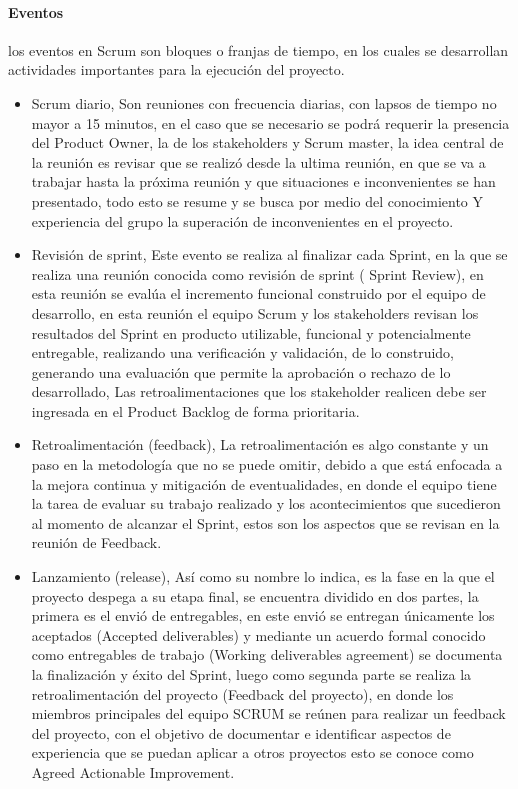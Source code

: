 \paragraph{Eventos}
los eventos en Scrum son bloques o franjas de tiempo, en los cuales se desarrollan actividades importantes para la ejecución del proyecto.
\begin{itemize}
    
    \item Scrum diario, Son reuniones con frecuencia diarias, con lapsos de tiempo no mayor a 15 minutos, en el caso que se necesario se podrá requerir la presencia del Product Owner, la de los stakeholders y Scrum master, la idea central de la reunión es revisar que se realizó desde la ultima reunión, en que se va a trabajar hasta la próxima reunión y que situaciones e inconvenientes se han presentado, todo esto se resume y se busca por medio del conocimiento Y experiencia del grupo la superación de inconvenientes en el proyecto. 
    \item Revisión de sprint, Este evento se realiza al finalizar cada Sprint, en la que se realiza una reunión conocida como revisión de sprint ( Sprint Review), en esta reunión se evalúa el incremento funcional construido por el equipo de desarrollo, en esta reunión el equipo Scrum y los stakeholders revisan los resultados del Sprint en producto utilizable, funcional y potencialmente entregable, realizando una verificación y validación, de lo construido, generando una evaluación que permite la aprobación o rechazo de lo desarrollado, Las retroalimentaciones que los stakeholder realicen debe ser ingresada  en el Product Backlog de forma prioritaria.  
    
     \item Retroalimentación (feedback), La retroalimentación es algo constante y un paso en la metodología que no se puede omitir, debido a que está enfocada a la mejora continua y mitigación de eventualidades, en donde el equipo tiene la tarea de evaluar su trabajo realizado y los acontecimientos que sucedieron al momento de alcanzar el Sprint, estos son los aspectos que se revisan en la reunión de Feedback.
     
     \item Lanzamiento (release), Así como su nombre lo indica, es la fase en la que el proyecto despega a su etapa final, se encuentra dividido en dos partes, la primera es el envió de entregables, en este envió se entregan únicamente los aceptados (Accepted deliverables) y mediante un acuerdo formal conocido como entregables de trabajo (Working deliverables agreement) se documenta la finalización y éxito del Sprint, luego como segunda parte se realiza la retroalimentación del proyecto (Feedback del proyecto), en donde los miembros principales del equipo SCRUM se reúnen para realizar un feedback del proyecto, con el objetivo de documentar e identificar aspectos de experiencia que se puedan aplicar a otros proyectos esto se conoce como Agreed Actionable Improvement. 
     

\end{itemize}
